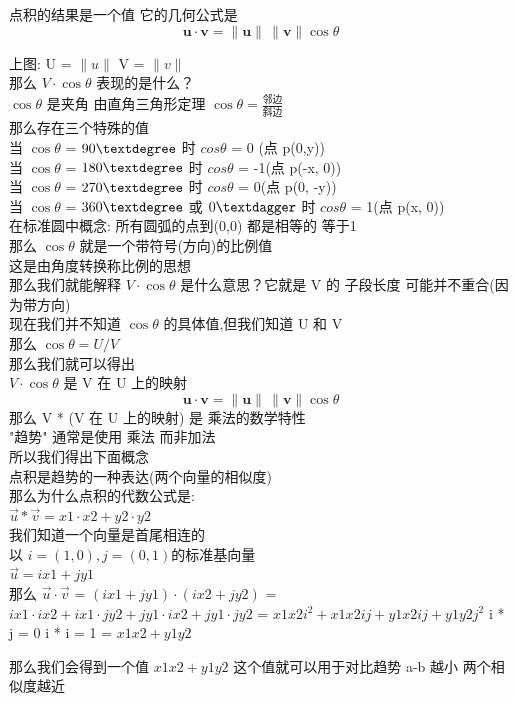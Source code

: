\documentclass[12pt]{article}
\begin{document}
\begin{flushleft}
点积的结果是一个值
它的几何公式是 
\[
\mathbf u \cdot \mathbf v = \|\mathbf u\|\,\|\mathbf v\|\cos\theta
\]

上图:
U = $\|u\|$  V = $\|v\|$ \\
那么 $V \cdot \cos\theta$ 表现的是什么？\\
$\cos\theta$ 是夹角 由直角三角形定理 $\cos\theta=\frac{邻边}{斜边}$\\
那么存在三个特殊的值 \\

当 $\cos\theta$ =  $90\textdegree$ 时  $cos\theta$ = 0 (点 p(0,y)) \\ 
当 $\cos\theta$ =  $180\textdegree$ 时 $cos\theta$ = -1(点 p(-x, 0)) \\ 
当 $\cos\theta$ =  $270\textdegree$ 时 $cos\theta$ = 0(点 p(0, -y)) \\ 
当 $\cos\theta$ =  $360\textdegree$ 或 $0\textdagger$ 时 $cos\theta$ = 1(点 p(x, 0)) \\ 

在标准圆中概念: 所有圆弧的点到(0,0) 都是相等的 等于1 \\ 
那么 $\cos\theta$ 就是一个带符号(方向)的比例值 \\ 
这是由角度转换称比例的思想  \\ 
那么我们就能解释 $V \cdot \cos\theta$ 是什么意思？它就是 V 的 子段长度 可能并不重合(因为带方向) \\ 

现在我们并不知道 $\cos\theta$ 的具体值,但我们知道 U 和 V \\  
那么 $\cos\theta = U / V$   \\ 
那么我们就可以得出   \\ 
$V \cdot \cos\theta$ 是 V 在 U 上的映射 \\ 
\[
\mathbf u \cdot \mathbf v = \|\mathbf u\|\,\|\mathbf v\|\cos\theta
\]
那么 V * (V 在 U 上的映射) 是 乘法的数学特性 \\ 
"趋势" 通常是使用 乘法 而非加法  \\ 

所以我们得出下面概念 \\ 
点积是趋势的一种表达(两个向量的相似度) \\ 

那么为什么点积的代数公式是: \\ 
$\vec{u} * \vec{v} = x1\cdot x2 + y2\cdot y2$ \\ 
我们知道一个向量是首尾相连的 \\ 
以 $i = (1, 0),j = (0, 1)$的标准基向量 \\
$\vec{u} = ix1 + jy1$ \\
那么 $\vec{u} \cdot \vec{v}$ 
= $(ix1 + jy1) \cdot (ix2 + jy2) $
= $ix1 \cdot ix2 +  ix1 \cdot jy2 + jy1 \cdot ix2  +  jy1\cdot jy2$
= $x1x2i^{2}  + x1x2ij +  y1x2ij + y1y2j^{2}$
i * j = 0
i * i = 1
= $x1x2 + y1y2$

那么我们会得到一个值 $x1x2 + y1y2$ 这个值就可以用于对比趋势 a-b 越小 两个相似度越近
\end{flushleft}
\end{document}
